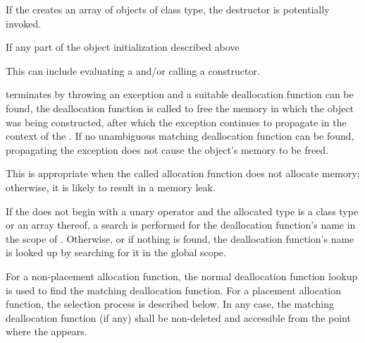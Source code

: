 \pnum
If the 
creates an array of objects of class type, the destructor is potentially
invoked.

\pnum
{}%
If any part of the object initialization described above%
\begin{footnote}
This can
include evaluating a  and/or calling
a constructor.
\end{footnote}
terminates by throwing an exception and a suitable deallocation function
can be found, the deallocation function is called to free the memory in
which the object was being constructed, after which the exception
continues to propagate in the context of the .
If no unambiguous matching deallocation function can be found,
propagating the exception does not cause the object's memory to be
freed.
\begin{note}
This is appropriate when the called allocation function does not
allocate memory; otherwise, it is likely to result in a memory leak.
\end{note}

\pnum
If the  does not begin with
a unary \tcode{::} operator and
the allocated type is a class type  or an array thereof,
a search is performed for the deallocation function's name
in the scope of .
Otherwise, or if nothing is found,
the deallocation function's name is looked up by
searching for it in the global scope.

\pnum
For a non-placement allocation function, the normal deallocation
function lookup is used to find the matching deallocation
function.
For a placement allocation function, the selection process is described below.
In any case,
the matching deallocation function (if any) shall be non-deleted and
accessible from the point where the  appears.

